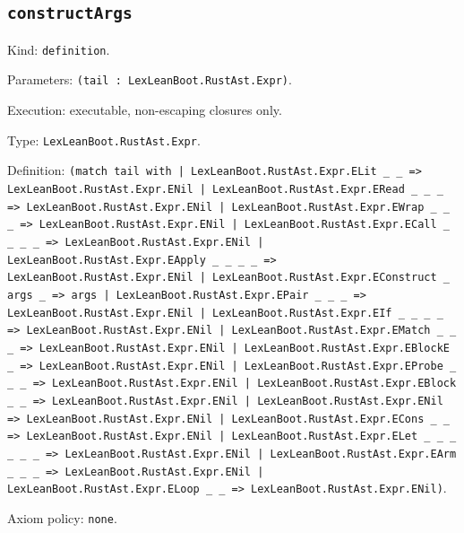 \documentclass[11pt]{article}
\begin{document}
\subsection*{\texttt{constructArgs}}
\noindent Kind: \texttt{definition}.\par
\noindent Parameters: \texttt{(tail : LexLeanBoot.RustAst.Expr)}.\par
\noindent Execution: executable, non-escaping closures only.\par
\noindent Type: \texttt{LexLeanBoot.RustAst.Expr}.\par
\noindent Definition: \texttt{(match tail with | LexLeanBoot.RustAst.Expr.ELit \_ \_ => LexLeanBoot.RustAst.Expr.ENil | LexLeanBoot.RustAst.Expr.ERead \_ \_ \_ => LexLeanBoot.RustAst.Expr.ENil | LexLeanBoot.RustAst.Expr.EWrap \_ \_ \_ => LexLeanBoot.RustAst.Expr.ENil | LexLeanBoot.RustAst.Expr.ECall \_ \_ \_ \_ => LexLeanBoot.RustAst.Expr.ENil | LexLeanBoot.RustAst.Expr.EApply \_ \_ \_ \_ => LexLeanBoot.RustAst.Expr.ENil | LexLeanBoot.RustAst.Expr.EConstruct \_ args \_ => args | LexLeanBoot.RustAst.Expr.EPair \_ \_ \_ => LexLeanBoot.RustAst.Expr.ENil | LexLeanBoot.RustAst.Expr.EIf \_ \_ \_ \_ => LexLeanBoot.RustAst.Expr.ENil | LexLeanBoot.RustAst.Expr.EMatch \_ \_ \_ => LexLeanBoot.RustAst.Expr.ENil | LexLeanBoot.RustAst.Expr.EBlockE \_ => LexLeanBoot.RustAst.Expr.ENil | LexLeanBoot.RustAst.Expr.EProbe \_ \_ \_ => LexLeanBoot.RustAst.Expr.ENil | LexLeanBoot.RustAst.Expr.EBlock \_ \_ => LexLeanBoot.RustAst.Expr.ENil | LexLeanBoot.RustAst.Expr.ENil => LexLeanBoot.RustAst.Expr.ENil | LexLeanBoot.RustAst.Expr.ECons \_ \_ => LexLeanBoot.RustAst.Expr.ENil | LexLeanBoot.RustAst.Expr.ELet \_ \_ \_ \_ \_ \_ => LexLeanBoot.RustAst.Expr.ENil | LexLeanBoot.RustAst.Expr.EArm \_ \_ \_ => LexLeanBoot.RustAst.Expr.ENil | LexLeanBoot.RustAst.Expr.ELoop \_ \_ => LexLeanBoot.RustAst.Expr.ENil)}.\par
\noindent Axiom policy: \texttt{none}.\par
\end{document}
